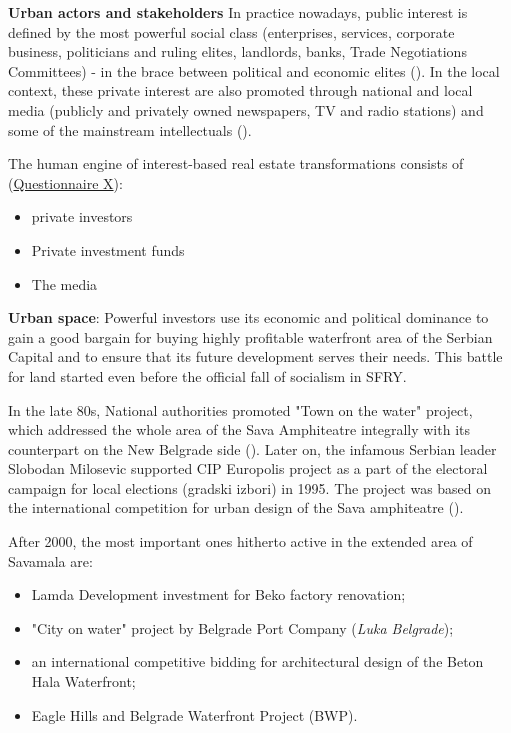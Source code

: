 \documentclass[11pt]{report}
\begin{document}
\begin{itemize}
\textbf{Urban actors and stakeholders}
In  practice nowadays, public interest is defined by the most powerful social class (enterprises, services, corporate business, politicians and ruling elites, landlords, banks, Trade Negotiations Committees) - in the brace between political and economic elites (\href{ref}{\citealt{ministarstvo_prostora_urbani_2014}}).
In the local context, these private interest are also promoted through national and local media (publicly and privately owned newspapers, TV and radio stations) and some of the mainstream intellectuals (\cite{cenzolovka tamara tekst}).

The human engine of interest-based real estate transformations consists of (\href{Questionnaire Experts Post-socialist}{Questionnaire X}):

\begin{itemize}
\item private investors
\item Private investment funds
\item The media
\end{itemize}

\textbf{Urban space}:
Powerful investors use its economic and political dominance to gain a good bargain for buying highly profitable waterfront area of the Serbian Capital and to ensure that its future development serves their needs. This battle for land started even before the official fall of socialism in SFRY.

In the late 80s, National authorities promoted "Town on the water" project, which addressed the whole area of the Sava Amphiteatre integrally with its counterpart on the New Belgrade side (\cite{Program Savskkog amfiteatra 1}).
Later on, the infamous Serbian leader Slobodan Milosevic supported CIP Europolis project as a part of the electoral campaign for local elections (gradski izbori) in 1995.
The project was based on the international competition for urban design of the Sava amphiteatre (\cite{Program Savskkog amfiteatra 1}).

After 2000, the most important ones hitherto active in the extended area of Savamala are:

\begin{itemize}
\item Lamda Development investment for Beko factory renovation;
\item "City on water" project by Belgrade Port Company (\textit{Luka Belgrade});
\item an international competitive bidding for architectural design of the Beton Hala Waterfront;
\item Eagle Hills and Belgrade Waterfront Project (BWP).
\end{itemize}


\end{itemize}
\end{document}
